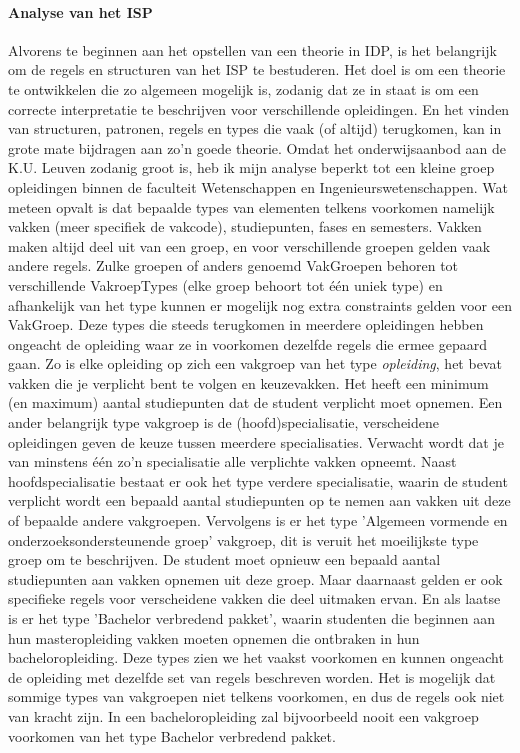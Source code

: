 \paragraph{Analyse van het ISP}
Alvorens te beginnen aan het opstellen van een theorie in IDP, is het belangrijk om de regels en structuren van het ISP te bestuderen. Het doel is om een theorie te ontwikkelen die zo algemeen mogelijk is, zodanig dat ze in staat is om een correcte interpretatie te beschrijven voor verschillende opleidingen. En het vinden van structuren, patronen, regels en types die vaak (of altijd) terugkomen, kan in grote mate bijdragen aan zo'n goede theorie. Omdat het onderwijsaanbod aan de K.U. Leuven zodanig groot is, heb ik mijn analyse beperkt tot een kleine groep opleidingen binnen de faculteit Wetenschappen en Ingenieurswetenschappen. Wat meteen opvalt is dat bepaalde types van elementen telkens voorkomen namelijk vakken (meer specifiek de vakcode), studiepunten, fases en semesters. Vakken maken altijd deel uit van een groep, en voor verschillende groepen gelden vaak andere regels. Zulke groepen of anders genoemd VakGroepen behoren tot verschillende VakroepTypes (elke groep behoort tot \'{e}\'{e}n uniek type) en afhankelijk van het type kunnen er mogelijk nog extra constraints gelden voor een VakGroep. Deze types die steeds terugkomen in meerdere opleidingen hebben ongeacht de opleiding waar ze in voorkomen dezelfde regels die ermee gepaard gaan. Zo is elke opleiding op zich een vakgroep van het type \emph{opleiding}, het bevat vakken die je verplicht bent te volgen en keuzevakken. Het heeft een minimum (en maximum) aantal studiepunten dat de student verplicht moet opnemen. Een ander belangrijk type vakgroep is de (hoofd)specialisatie, verscheidene opleidingen geven de keuze tussen meerdere specialisaties. Verwacht wordt dat je van minstens \'{e}\'{e}n zo'n specialisatie alle verplichte vakken opneemt. Naast hoofdspecialisatie bestaat er ook het type verdere specialisatie, waarin de student verplicht wordt een bepaald aantal studiepunten op te nemen aan vakken uit deze of bepaalde andere vakgroepen. Vervolgens is er het type 'Algemeen vormende en onderzoeksondersteunende groep' vakgroep, dit is veruit het moeilijkste type groep om te beschrijven. De student moet opnieuw een bepaald aantal studiepunten aan vakken opnemen uit deze groep. Maar daarnaast gelden er ook specifieke regels voor verscheidene vakken die deel uitmaken ervan. En als laatse is er het type 'Bachelor verbredend pakket', waarin studenten die beginnen aan hun masteropleiding vakken moeten opnemen die ontbraken in hun bacheloropleiding. Deze types zien we het vaakst voorkomen en kunnen ongeacht de opleiding met dezelfde set van regels beschreven worden. Het is mogelijk dat sommige types van vakgroepen niet telkens voorkomen, en dus de regels ook niet van kracht zijn. In een bacheloropleiding zal bijvoorbeeld nooit een vakgroep voorkomen van het type Bachelor verbredend pakket. 

